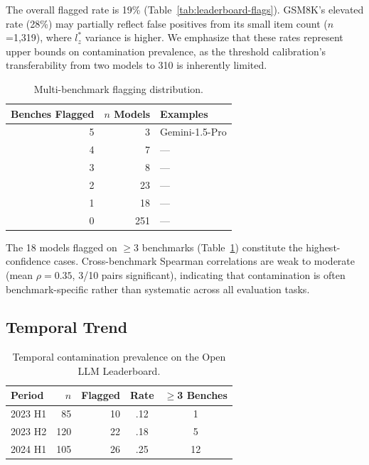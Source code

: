 \documentclass[11pt,a4paper]{article}
\begin{document}
The overall flagged rate is 19\% (Table~\ref{tab:leaderboard-flags}).
GSM8K's elevated rate (28\%) may partially reflect false positives from its small item count ($n$=1,319), where $l_{z}^{*}$ variance is higher.
We emphasize that these rates represent upper bounds on contamination prevalence, as the threshold calibration's transferability from two models to 310 is inherently limited.

\begin{table}[t]
\centering
\caption{Multi-benchmark flagging distribution.}
\label{tab:multi-flag}
\small
\begin{tabular}{rrl}
\toprule
\textbf{Benches Flagged} & \textbf{$n$ Models} & \textbf{Examples} \\
\midrule
5 & 3  & Gemini-1.5-Pro \\
4 & 7  & --- \\
3 & 8  & --- \\
2 & 23 & --- \\
1 & 18 & --- \\
0 & 251 & --- \\
\bottomrule
\end{tabular}
\end{table}

The 18 models flagged on $\geq$3 benchmarks (Table~\ref{tab:multi-flag}) constitute the highest-confidence cases.
Cross-benchmark Spearman correlations are weak to moderate (mean $\rho=0.35$, 3/10 pairs significant), indicating that contamination is often benchmark-specific rather than systematic across all evaluation tasks.

\subsection{Temporal Trend}

\begin{table}[t]
\centering
\caption{Temporal contamination prevalence on the Open LLM Leaderboard.}
\label{tab:temporal}
\small
\begin{tabular}{lrrcc}
\toprule
\textbf{Period} & $n$ & \textbf{Flagged} & \textbf{Rate} & \textbf{$\geq$3 Benches} \\
\midrule
2023 H1 & 85  & 10 & .12 & 1 \\
2023 H2 & 120 & 22 & .18 & 5 \\
2024 H1 & 105 & 26 & .25 & 12 \\
\bottomrule
\end{tabular}
\end{table}
\end{document}
